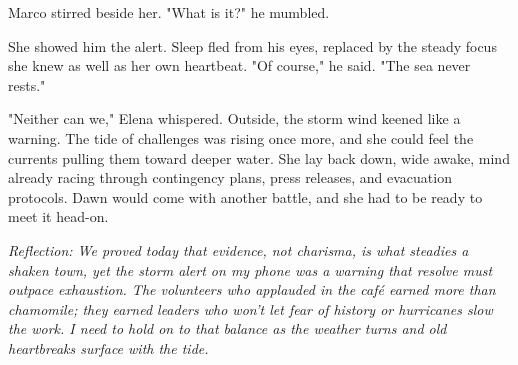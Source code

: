 Marco stirred beside her. "What is it?" he mumbled.

She showed him the alert. Sleep fled from his eyes, replaced by the steady focus she knew as well as her own heartbeat. "Of course," he said. "The sea never rests."

"Neither can we," Elena whispered. Outside, the storm wind keened like a warning. The tide of challenges was rising once more, and she could feel the currents pulling them toward deeper water. She lay back down, wide awake, mind already racing through contingency plans, press releases, and evacuation protocols. Dawn would come with another battle, and she had to be ready to meet it head-on.


\noindent\textit{Reflection: We proved today that evidence, not charisma, is what steadies a shaken town, yet the storm alert on my phone was a warning that resolve must outpace exhaustion. The volunteers who applauded in the café earned more than chamomile; they earned leaders who won't let fear of history or hurricanes slow the work. I need to hold on to that balance as the weather turns and old heartbreaks surface with the tide.}

